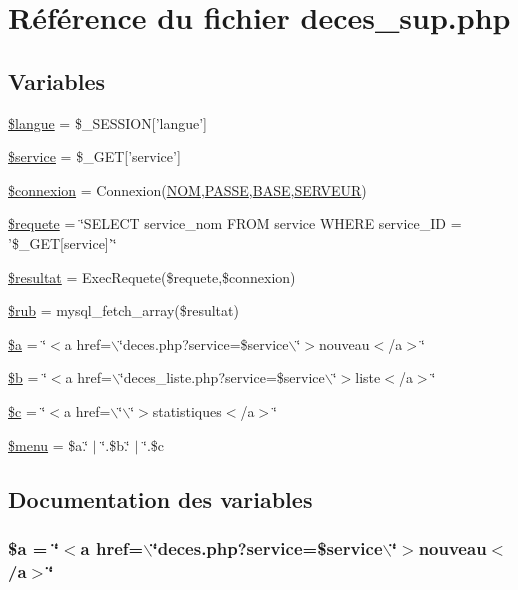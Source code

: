 \hypertarget{deces__sup_8php}{
\section{R\'{e}f\'{e}rence du fichier deces\_\-sup.php}
\label{deces__sup_8php}
}
\subsection*{Variables}
\begin{CompactItemize}
\item 
\hyperlink{deces__sup_8php_a0}{\$langue} = \$\_\-SESSION\mbox{[}'langue'\mbox{]}
\item 
\hyperlink{deces__sup_8php_a1}{\$service} = \$\_\-GET\mbox{[}'service'\mbox{]}
\item 
\hyperlink{deces__sup_8php_a2}{\$connexion} = Connexion(\hyperlink{pma__connect_8php_a0}{NOM},\hyperlink{pma__connect_8php_a1}{PASSE},\hyperlink{pma__connect_8php_a3}{BASE},\hyperlink{pma__connect_8php_a2}{SERVEUR})
\item 
\hyperlink{deces__sup_8php_a3}{\$requete} = \char`\"{}SELECT service\_\-nom FROM service WHERE service\_\-ID = '\$\_\-GET\mbox{[}service\mbox{]}'\char`\"{}
\item 
\hyperlink{deces__sup_8php_a4}{\$resultat} = Exec\-Requete(\$requete,\$connexion)
\item 
\hyperlink{deces__sup_8php_a5}{\$rub} = mysql\_\-fetch\_\-array(\$resultat)
\item 
\hyperlink{deces__sup_8php_a6}{\$a} = \char`\"{}$<$a href=$\backslash$\char`\"{}deces.php?service=\$service$\backslash$\char`\"{}$>$nouveau$<$/a$>$\char`\"{}
\item 
\hyperlink{deces__sup_8php_a7}{\$b} = \char`\"{}$<$a href=$\backslash$\char`\"{}deces\_\-liste.php?service=\$service$\backslash$\char`\"{}$>$liste$<$/a$>$\char`\"{}
\item 
\hyperlink{deces__sup_8php_a8}{\$c} = \char`\"{}$<$a href=$\backslash$\char`\"{}$\backslash$\char`\"{}$>$statistiques$<$/a$>$\char`\"{}
\item 
\hyperlink{deces__sup_8php_a9}{\$menu} = \$a.\char`\"{} $|$ \char`\"{}.\$b.\char`\"{} $|$ \char`\"{}.\$c
\end{CompactItemize}


\subsection{Documentation des variables}
\hypertarget{deces__sup_8php_a6}{
\subsubsection[\$a]{\setlength{\rightskip}{0pt plus 5cm}\$a = \char`\"{}$<$a href=$\backslash$\char`\"{}deces.php?service=\$service$\backslash$\char`\"{}$>$nouveau$<$/a$>$\char`\"{}}}
\label{deces__sup_8php_a6}


